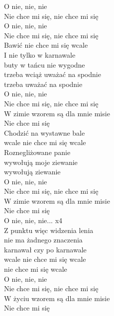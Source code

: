 \begin{text}
O nie, nie, nie\\
Nie chce mi się, nie chce mi się\\
O nie, nie, nie\\
Nie chce mi się, nie chce mi się\\

Bawić nie chce mi się wcale\\
I nie tylko w karnawale\\
buty w tańcu nie wygodne\\
trzeba wciąż uważać na spodnie\\
trzeba uważać na spodnie\\

O nie, nie, nie\\
Nie chce mi się, nie chce mi się\\
W zimie wzorem są dla mnie misie\\
Nie chce mi się\\

Chodzić na wystawne bale\\
wcale nie chce mi się wcale\\
Roznegliżowane panie\\
wywołują moje ziewanie\\
wywołują ziewanie\\

O nie, nie, nie\\
Nie chce mi się, nie chce mi się\\
W zimie wzorem są dla mnie misie\\
Nie chce mi się\\

O nie, nie, nie... x4\\

Z punktu więc widzenia lenia\\
nie ma żadnego znaczenia\\
karnawał czy po karnawale\\
wcale nie chce mi się wcale\\
nie chce mi się wcale\\

O nie, nie, nie\\
Nie chce mi się, nie chce mi się\\
W życiu wzorem są dla mnie misie\\
Nie chce mi się\\
\end{text}
